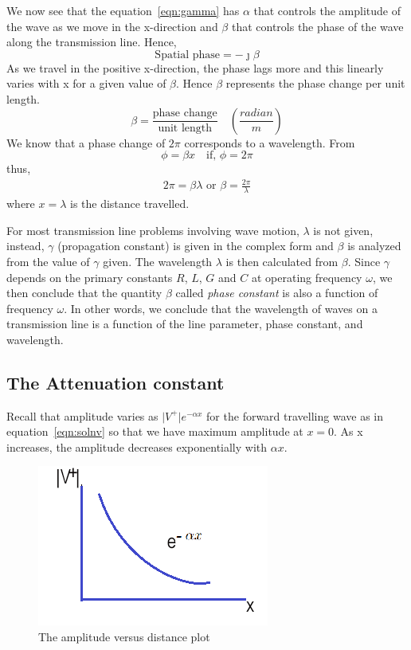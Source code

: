 We now see that the equation~\eqref{eqn:gamma} has $\alpha$ that controls the amplitude of the wave as we move in the x-direction and $\beta$ that controls the phase of the wave along the transmission line. Hence,
\begin{equation}
\text{Spatial phase} = -\jmath\beta
\end{equation}
As we travel in the positive x-direction, the phase lags more and this linearly varies with x for a given value of $\beta$. Hence $\beta$ represents the phase change per unit length.
\begin{equation}
\beta = \frac{\text{phase change}}{\text{unit length}} \quad\left(\frac{radian}{m}\right)
\label{eqn:phaseconstant}
\end{equation}
We know that a phase change of $2\pi$ corresponds to a wavelength. From
\begin{equation*}
\phi = \beta x \quad\text{if, }\phi = 2\pi
\end{equation*}
thus,
\begin{align*}
2\pi = \beta\lambda\text{ or }\beta = \frac{2\pi}{\lambda}
\end{align*}
where $ x = \lambda $ is the distance travelled.

For most transmission line problems involving wave motion, $\lambda$ is not given, instead, $\gamma$ (propagation constant) is given in the complex form and $\beta$ is analyzed from the value of $\gamma$ given. The wavelength $\lambda$ is then calculated from $\beta$. Since $\gamma$ depends on the primary constants $R$, $L$, $G$ and $C$ at operating frequency $\omega$, we then conclude that the quantity $\beta$ called \emph{phase constant} is also a function of frequency $\omega$. In other words, we conclude that the wavelength of waves on a transmission line is a function of the line parameter, phase constant, and wavelength.

\subsection{The Attenuation constant}
Recall that amplitude varies as $\lvert V^+\rvert e^{-\alpha x}$ for the forward travelling wave as in equation~\eqref{eqn:solnv} so that we have maximum amplitude at $x = 0$. As x increases, the amplitude decreases exponentially with $\alpha x$. 
\begin{figure}[h]
\centering
\includegraphics[width=0.7\linewidth]{graphics/VversusXcurve}
\caption{The amplitude versus distance plot}
\label{fig:VversusXcurve}
\end{figure}

